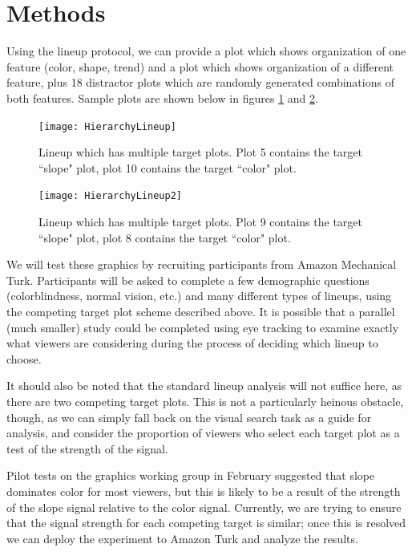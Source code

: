 \documentclass[11pt]{isuthesis}\usepackage[]{graphicx}\usepackage[]{color}
\begin{document}
\section{Methods}
Using the lineup protocol, we can provide a plot which shows organization of one feature (color, shape, trend) and a plot which shows organization of a different feature, plus 18 distractor plots which are randomly generated combinations of both features. Sample plots are shown below in figures \ref{fig:hierarchylineup} and \ref{fig:hierarchylineup2}.

\begin{figure}[htbp]\centering
\texttt{[image: HierarchyLineup]}
\caption[Sample multi-target lineup]{Lineup which has multiple target plots. Plot 5 contains the target ``slope" plot, plot 10 contains the target ``color" plot.}\label{fig:hierarchylineup}
\end{figure}

\begin{figure}[htbp]\centering
\texttt{[image: HierarchyLineup2]}
\caption[Another sample multi-target lineup]{Lineup which has multiple target plots. Plot 9 contains the target ``slope" plot, plot 8 contains the target ``color" plot.}\label{fig:hierarchylineup2}
\end{figure}

We will test these graphics by recruiting participants from Amazon Mechanical Turk. Participants will be asked to complete a few demographic questions (colorblindness, normal vision, etc.) and many different types of lineups, using the competing target plot scheme described above. It is possible that a parallel (much smaller) study could be completed using eye tracking to examine exactly what viewers are considering during the process of deciding which lineup to choose. 

It should also be noted that the standard lineup analysis \citep{majumder2013validation} will not suffice here, as there are two competing target plots. This is not a particularly heinous obstacle, though, as we can simply fall back on the visual search task as a guide for analysis, and consider the proportion of viewers who select each target plot as a test of the strength of the signal. 

Pilot tests on the graphics working group in February suggested that slope dominates color for most viewers, but this is likely to be a result of the strength of the slope signal relative to the color signal. Currently, we are trying to ensure that the signal strength for each competing target is similar; once this is resolved we can deploy the experiment to Amazon Turk and analyze the results. 
% 
% 

\end{document}
